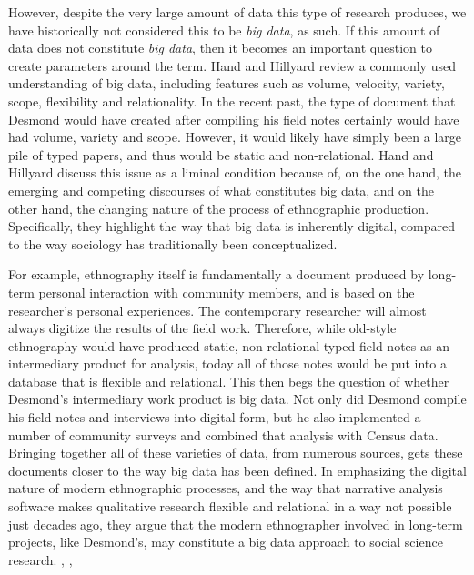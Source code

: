 \documentclass[sigconf]{acmart}
\begin{document}
However, despite the very large amount of data this type of research produces, we have historically not considered this to be {\em big data}, as such.  If this amount of data does not constitute {\em big data}, then it becomes an important question to create parameters around the term. Hand and Hillyard review a commonly used understanding of big data, including features such as volume, velocity, variety, scope, flexibility and relationality. \cite {hand14} In the recent past, the type of document that Desmond would have created after compiling his field notes certainly would have had volume, variety and scope.  However, it would likely have simply been a large pile of typed papers, and thus would be static and non-relational.  Hand and Hillyard discuss this issue as a liminal condition because of, on the one hand, the emerging and competing discourses of what constitutes big data, and on the other hand, the changing nature of the process of ethnographic production.  Specifically, they highlight the way that big data is inherently digital, compared to the way sociology has traditionally been conceptualized.  

For example, ethnography itself is fundamentally a document produced by long-term personal interaction with community members, and is based on the researcher's personal experiences.  The contemporary researcher will almost always digitize the results of the field work.  Therefore, while old-style ethnography would have produced static, non-relational typed field notes as an intermediary product for analysis, today all of those notes would be put into a database that is flexible and relational.  This then begs the question of whether Desmond's intermediary work product is big data.  Not only did Desmond compile his field notes and interviews into digital form, but he also implemented a number of community surveys and combined that analysis with Census data. \cite{desmond16} Bringing together all of these varieties of data, from numerous sources, gets these documents closer to the way big data has been defined.  In emphasizing the digital nature of modern ethnographic processes, and the way that narrative analysis software makes qualitative research flexible and relational in a way not possible just decades ago, they argue that the modern ethnographer involved in long-term projects, like Desmond's, may constitute a big data approach to social science research. \cite{hand14}, \cite{japec15}, \cite{lazer17}
\end{document}
